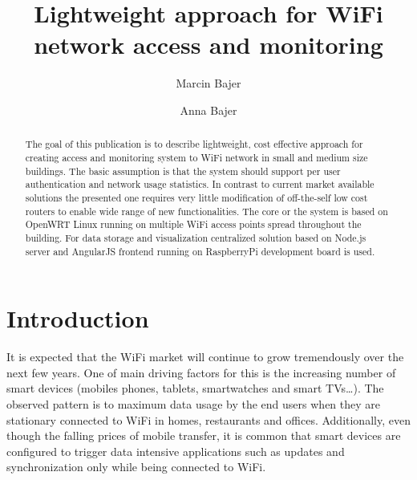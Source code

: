 \documentclass{llncs}
\begin{document}
%
\frontmatter          %
%
\pagestyle{headings}  %
%
\mainmatter              %
%
\title{Lightweight approach for WiFi network access and monitoring}

\author{Marcin Bajer \and Anna Bajer}
%
%
%

\maketitle              %

\begin{abstract}
The goal of this publication is to describe lightweight, cost effective approach
for creating access and monitoring system to WiFi network in small and medium
size buildings.
The basic assumption is that the system should support per user
authentication and network usage statistics.
In contrast to current market available solutions the presented one requires
very little modification of off-the-self low cost routers to enable wide range
of new functionalities. The core or the system is based on OpenWRT Linux running
on multiple WiFi access points spread throughout the building.
For data storage and visualization centralized solution 
based on Node.js server and AngularJS frontend running on RaspberryPi
development board is used.
\end{abstract}
%
\section{Introduction}
%

It is expected that the WiFi market will continue to grow tremendously over the
next few years. One of main driving factors for this is the increasing number of
smart devices (mobiles phones, tablets, smartwatches and smart TVs\ldots). The
observed pattern is to maximum data usage by the end users when they are
stationary connected to WiFi in homes, restaurants and offices.
Additionally, even though the falling prices of mobile transfer, it is common that
smart devices are configured to trigger data intensive applications such as
updates and synchronization only while being connected to WiFi.
\end{document}
